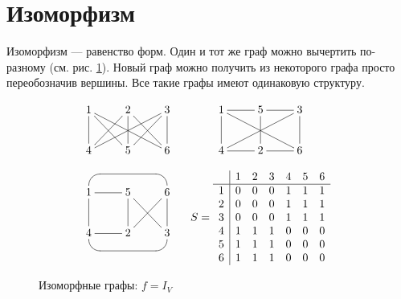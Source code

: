 \section{Изоморфизм}

Изоморфизм --- равенство форм. Один и тот же граф можно вычертить по-разному (см. рис. \ref{fig:graph:izomorpic}). Новый граф можно получить из некоторого графа просто переобозначив вершины. Все такие графы имеют одинаковую структуру.

\begin{figure}
    \[
        \begin{tabular}{cc}
            \(
                {\xymatrix{
                    1 \ar@{-}[d] \ar@{-}[dr] \ar@{-}[drr]
                        &2 \ar@{-}[dl] \ar@{-}[d] \ar@{-}[dr]
                            &3 \ar@{-}[dll] \ar@{-}[dl] \ar@{-}[d]
                                \\
                    4
                        &5
                            &6
                }}
            \)
                &
                \(
                    {\xymatrix{
                        1 \ar@{-}[d] \ar@{-}[r] \ar@{-}[drr]
                            &5 
                                &3 \ar@{-}[dll] \ar@{-}[l] \ar@{-}[d]
                                    \\
                        4
                            &2 \ar@{-}[l] \ar@{-}[u] \ar@{-}[r]
                                &6
                    }}
                \)
                    \\
                    &\\
            \(
                {\xymatrix{
                    1 \ar@{-}[d] \ar@{-}[r] \ar@{-}`u[r]`r[rr][rr]
                        &5 \ar@{-}[dr]\ar@{-}[d]
                            &6 \ar@{-}[d]
                                \\
                    4 \ar@{-}[r] \ar@{-}`d[rr]`[rr][rr]
                        &2 \ar@{-}[ur]
                            &3
                }}
            \)
                &
                \raisebox{-.5\height}{
                    \(
                        S=
                        \begin{array}{c|cccccc}
                             &1&2&3&4&5&6\\ \hline
                            1&0&0&0&1&1&1\\
                            2&0&0&0&1&1&1\\
                            3&0&0&0&1&1&1\\
                            4&1&1&1&0&0&0\\
                            5&1&1&1&0&0&0\\
                            6&1&1&1&0&0&0
                        \end{array}
                    \)        
                }
        \end{tabular}
    \]
    \caption{Изоморфные графы: $f=I_V$}
    \label{fig:graph:izomorpic}
\end{figure}

